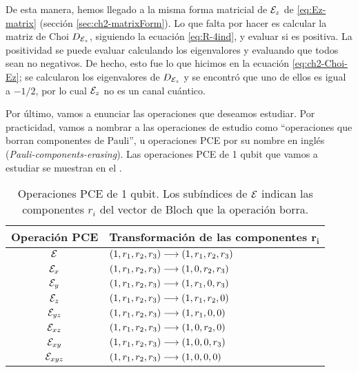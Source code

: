 De esta manera, hemos llegado a la misma forma matricial de $\mathcal{E}_z$
de \eqref{eq:Ez-matrix} (sección \ref{sec:ch2-matrixForm}). 
Lo que falta por hacer es calcular la matriz
de Choi $D_{\mathcal{E}_z}$, siguiendo la ecuación \eqref{eq:R-4ind}, y 
evaluar si es positiva. La positividad se puede evaluar 
calculando los eigenvalores y evaluando que todos 
sean no negativos. De hecho, esto fue lo que hicimos en 
la ecuación \eqref{eq:ch2-Choi-Ez};
se calcularon los eigenvalores de $D_{\mathcal{E}_z}$ y se 
encontró que uno de ellos es igual a $-1/2$, por lo cual $\mathcal{E}_z$ no 
es un canal cuántico.

Por último, vamos a enunciar las operaciones que 
deseamos estudiar. Por practicidad, vamos a nombrar 
a las operaciones de estudio como ``operaciones
que borran componentes de Pauli'', u operaciones PCE
por su nombre en inglés (\textit{Pauli-components-erasing}). 
Las operaciones PCE de 1 qubit que vamos a estudiar 
se muestran en el .
\begin{table}
\centering
\begin{tabular}{|c|l|} 
\hline
\textbf{Operación PCE} & 
\textbf{Transformación de las componentes} $\mathbf{r_i}$ \\
\hline
$\mathcal{E}_{}$ & \hspace{1.2cm}$\qty(1,r_1,r_2,r_3)\longrightarrow\qty(1,r_1,r_2,r_3)$ \\ 
\hline 
$\mathcal{E}_{x}$ & \hspace{1.2cm}$\qty(1,r_1,r_2,r_3)\longrightarrow\qty(1,0,r_2,r_3)$ \\ 
\hline 
$\mathcal{E}_{y}$ & \hspace{1.2cm}$\qty(1,r_1,r_2,r_3)\longrightarrow\qty(1,r_1,0,r_3)$ \\ 
\hline 
$\mathcal{E}_{z}$ & \hspace{1.2cm}$\qty(1,r_1,r_2,r_3)\longrightarrow\qty(1,r_1,r_2,0)$ \\ 
\hline 
$\mathcal{E}_{yz}$ & \hspace{1.2cm}$\qty(1,r_1,r_2,r_3)\longrightarrow\qty(1,r_1,0,0)$ \\ 
\hline 
$\mathcal{E}_{xz}$ & \hspace{1.2cm}$\qty(1,r_1,r_2,r_3)\longrightarrow\qty(1,0,r_2,0)$ \\ 
\hline 
$\mathcal{E}_{xy}$ & \hspace{1.2cm}$\qty(1,r_1,r_2,r_3)\longrightarrow\qty(1,0,0,r_3)$ \\ 
\hline 
$\mathcal{E}_{xyz}$ & \hspace{1.2cm}$\qty(1,r_1,r_2,r_3)\longrightarrow\qty(1,0,0,0)$ \\ 
\hline
\end{tabular}   
\caption{Operaciones PCE de 1 qubit. 
Los subíndices de $\mathcal{E}$ indican las componentes $r_i$ 
del vector de Bloch que la operación borra.}
\label{cuadro:operacionesPCE-1q}
\end{table}

